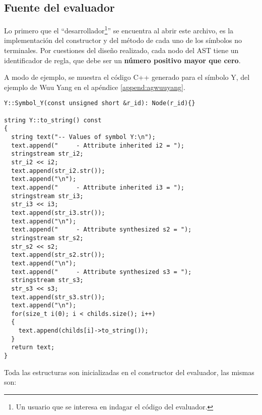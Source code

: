 \subsection{Fuente del evaluador}

Lo primero que el ``desarrollador\footnote{Un usuario que se interesa en indagar el código del evaluador.}'' se encuentra al abrir este archivo, es la implementación del constructor y del método  de cada uno de los símbolos no terminales. Por cuestiones del diseño realizado, cada nodo del AST tiene un identificador de regla, que debe ser un \textbf{número positivo mayor que cero}.

A modo de ejemplo, se muestra el código C++ generado para el símbolo Y, del ejemplo de Wuu Yang en el apéndice \ref{append:agwuuyang}.

\begin{lstlisting}[columns=fullflexible, linewidth=9.3cm]
Y::Symbol_Y(const unsigned short &r_id): Node(r_id){}

string Y::to_string() const
{
  string text("-- Values of symbol Y:\n");
  text.append("     - Attribute inherited i2 = ");
  stringstream str_i2;
  str_i2 << i2;
  text.append(str_i2.str());
  text.append("\n");
  text.append("     - Attribute inherited i3 = ");
  stringstream str_i3;
  str_i3 << i3;
  text.append(str_i3.str());
  text.append("\n");
  text.append("     - Attribute synthesized s2 = ");
  stringstream str_s2;
  str_s2 << s2;
  text.append(str_s2.str());
  text.append("\n");
  text.append("     - Attribute synthesized s3 = ");
  stringstream str_s3;
  str_s3 << s3;
  text.append(str_s3.str());
  text.append("\n");
  for(size_t i(0); i < childs.size(); i++)
  {
    text.append(childs[i]->to_string());
  }
  return text;
}
\end{lstlisting}

Toda las estructuras son inicializadas en el constructor del evaluador, las mismas son:

